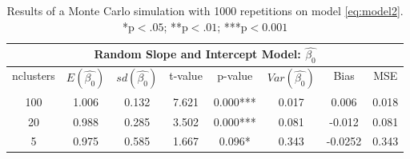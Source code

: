 \documentclass[a4paper,11pt]{article}
\begin{document}
\begin{table}[h!]
	\centering
	\begin{tabular}{||c c c c c c c c||} 
		\hline
		\multicolumn{8}{|c|}{Random Slope and Intercept Model: $\hat{\beta_0}$} \\
		
		\hline
		nclusters & $E(\hat{\beta_0})$ & $sd(\hat{\beta_0})$&t-value &p-value &$Var(\hat{\beta_0})$ & Bias & MSE \\ [0.5ex] 
		\hline
		100 &1.006&0.132&7.621&0.000*** &0.017&0.006& 0.018\\ 
		20 &0.988&0.285&3.502&0.000*** &0.081&-0.012&0.081 \\ 	
		5 &0.975&0.585&1.667&0.096* &0.343&-0.0252& 0.343\\ 
		[1ex] 
		\hline
	\end{tabular}
	\caption{Results of a Monte Carlo simulation with 1000 repetitions on model \ref{eq:model2}. \\*p$<.05$; **p$<.01$; ***p$<0.001$}
	\label{table:4}
\end{table}
		
\end{document}
